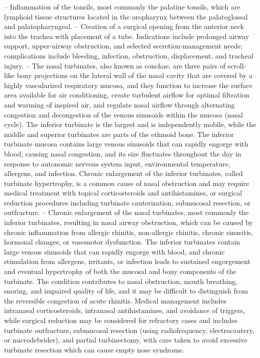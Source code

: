 -- Inflammation of the tonsils, most commonly the palatine tonsils, which are lymphoid tissue structures located in the oropharynx between the palatoglossal and palatopharyngeal.
-- Creation of a surgical opening from the anterior neck into the trachea with placement of a tube. Indications include prolonged airway support, upper-airway obstruction, and selected secretion-management needs; complications include bleeding, infection, obstruction, displacement, and tracheal injury.
-- The nasal turbinates, also known as conchae, are three pairs of scroll-like bony projections on the lateral wall of the nasal cavity that are covered by a highly vascularized respiratory mucosa, and they function to increase the surface area available for air conditioning, create turbulent airflow for optimal filtration and warming of inspired air, and regulate nasal airflow through alternating congestion and decongestion of the venous sinusoids within the mucosa (nasal cycle). The inferior turbinate is the largest and is independently mobile, while the middle and superior turbinates are parts of the ethmoid bone. The inferior turbinate mucosa contains large venous sinusoids that can rapidly engorge with blood, causing nasal congestion, and its size fluctuates throughout the day in response to autonomic nervous system input, environmental temperature, allergens, and infection. Chronic enlargement of the inferior turbinates, called turbinate hypertrophy, is a common cause of nasal obstruction and may require medical treatment with topical corticosteroids and antihistamines, or surgical reduction procedures including turbinate cauterization, submucosal resection, or outfracture.
-- Chronic enlargement of the nasal turbinates, most commonly the inferior turbinates, resulting in nasal airway obstruction, which can be caused by chronic inflammation from allergic rhinitis, non-allergic rhinitis, chronic sinusitis, hormonal changes, or vasomotor dysfunction. The inferior turbinates contain large venous sinusoids that can rapidly engorge with blood, and chronic stimulation from allergens, irritants, or infection leads to sustained engorgement and eventual hypertrophy of both the mucosal and bony components of the turbinate. The condition contributes to nasal obstruction, mouth breathing, snoring, and impaired quality of life, and it may be difficult to distinguish from the reversible congestion of acute rhinitis. Medical management includes intranasal corticosteroids, intranasal antihistamines, and avoidance of triggers, while surgical reduction may be considered for refractory cases and includes turbinate outfracture, submucosal resection (using radiofrequency, electrocautery, or microdebrider), and partial turbinectomy, with care taken to avoid excessive turbinate resection which can cause empty nose syndrome.
